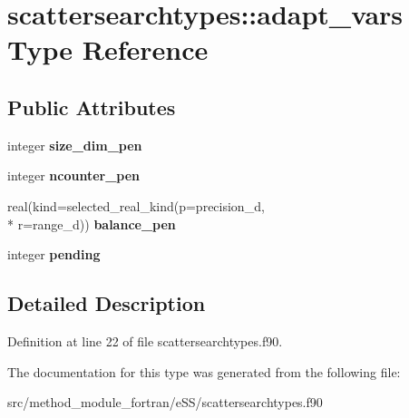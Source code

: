 \hypertarget{structscattersearchtypes_1_1adapt__vars}{\section{scattersearchtypes\-:\-:adapt\-\_\-vars Type Reference}
\label{structscattersearchtypes_1_1adapt__vars}
}
\subsection*{Public Attributes}
\begin{DoxyCompactItemize}
\item 
\hypertarget{structscattersearchtypes_1_1adapt__vars_a5fd996faf1a0ad1907ea57ea6ba23b49}{integer {\bfseries size\-\_\-dim\-\_\-pen}}\label{structscattersearchtypes_1_1adapt__vars_a5fd996faf1a0ad1907ea57ea6ba23b49}

\item 
\hypertarget{structscattersearchtypes_1_1adapt__vars_a442bb1d6f0cfba52cd6415d20aaabbf0}{integer {\bfseries ncounter\-\_\-pen}}\label{structscattersearchtypes_1_1adapt__vars_a442bb1d6f0cfba52cd6415d20aaabbf0}

\item 
\hypertarget{structscattersearchtypes_1_1adapt__vars_ab98274f6222ee053b942d2493bd18db8}{real(kind=selected\-\_\-real\-\_\-kind(p=precision\-\_\-d, \\*
r=range\-\_\-d)) {\bfseries balance\-\_\-pen}}\label{structscattersearchtypes_1_1adapt__vars_ab98274f6222ee053b942d2493bd18db8}

\item 
\hypertarget{structscattersearchtypes_1_1adapt__vars_aa207acbd37b132ad61823a8e1498f9dd}{integer {\bfseries pending}}\label{structscattersearchtypes_1_1adapt__vars_aa207acbd37b132ad61823a8e1498f9dd}

\end{DoxyCompactItemize}


\subsection{Detailed Description}


Definition at line 22 of file scattersearchtypes.\-f90.



The documentation for this type was generated from the following file\-:\begin{DoxyCompactItemize}
\item 
src/method\-\_\-module\-\_\-fortran/e\-S\-S/scattersearchtypes.\-f90\end{DoxyCompactItemize}
